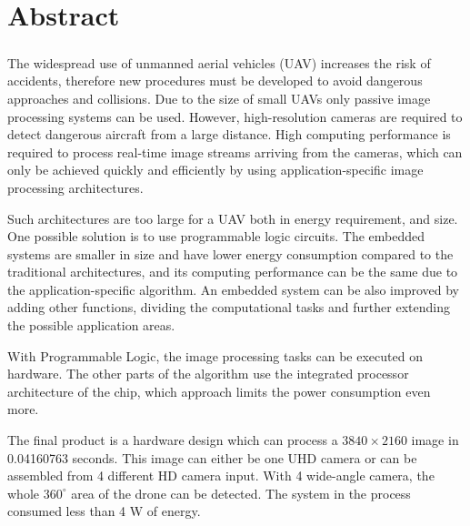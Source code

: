 \chapter*{Abstract}
\paragraph{}
The widespread use of unmanned aerial vehicles (UAV) increases the risk of accidents, therefore new procedures must be developed to avoid dangerous approaches and collisions.
Due to the size of small UAVs only passive image processing systems can be used.
However, high-resolution cameras are required to detect dangerous aircraft from a large distance.
High computing performance is required to process real-time image streams arriving from the cameras, which can only be achieved quickly and efficiently by using application-specific image processing architectures.

Such architectures are too large for a UAV both in energy requirement, and size.
One possible solution is to use programmable logic circuits.
The embedded systems are smaller in size and have lower energy consumption compared to the traditional architectures, and its computing performance can be the same due to the application-specific algorithm. 
An embedded system can be also improved by adding other functions, dividing the computational tasks and further extending the possible application areas.

With Programmable Logic, the image processing tasks can be executed on hardware.
The other parts of the algorithm use the integrated processor architecture of the chip, which approach limits the power consumption even more.

The final product is a hardware design which can process a $3840 \times 2160$ image in 0.04160763 seconds.
This image can either be one UHD camera or can be assembled from 4 different HD camera input.
With 4 wide-angle camera, the whole $360^\circ$ area of the drone can be detected.
The system in the process consumed less than 4 W of energy.

\clearpage